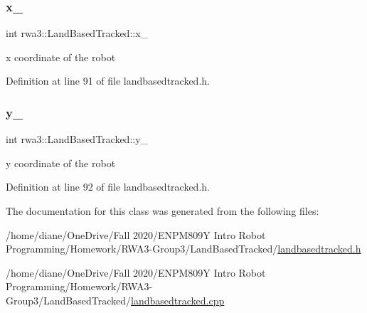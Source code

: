 \subsubsection{\texorpdfstring{x\+\_\+}{x\_}}
{\footnotesize\ttfamily int rwa3\+::\+Land\+Based\+Tracked\+::x\+\_\+\hspace{0.3cm}{\ttfamily [protected]}}

x coordinate of the robot 

Definition at line 91 of file landbasedtracked.\+h.

\mbox{\label{classrwa3_1_1_land_based_tracked_aa6273b2cfff5572934f132cf0ada463e}} 
\subsubsection{\texorpdfstring{y\+\_\+}{y\_}}
{\footnotesize\ttfamily int rwa3\+::\+Land\+Based\+Tracked\+::y\+\_\+\hspace{0.3cm}{\ttfamily [protected]}}

y coordinate of the robot 

Definition at line 92 of file landbasedtracked.\+h.



The documentation for this class was generated from the following files\+:\begin{DoxyCompactItemize}
\item 
/home/diane/\+One\+Drive/\+Fall 2020/\+E\+N\+P\+M809\+Y Intro Robot Programming/\+Homework/\+R\+W\+A3-\/\+Group3/\+Land\+Based\+Tracked/\hyperlink{landbasedtracked_8h}{landbasedtracked.\+h}\item 
/home/diane/\+One\+Drive/\+Fall 2020/\+E\+N\+P\+M809\+Y Intro Robot Programming/\+Homework/\+R\+W\+A3-\/\+Group3/\+Land\+Based\+Tracked/\hyperlink{landbasedtracked_8cpp}{landbasedtracked.\+cpp}\end{DoxyCompactItemize}
